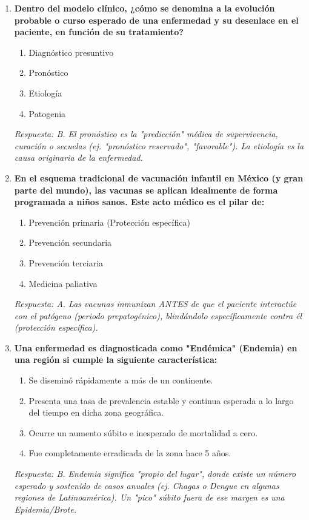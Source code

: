 \documentclass[spanish,letterpaper,oneside]{article}
\begin{document}
\begin{enumerate}[label=\textbf{\arabic*.}]
    \item \textbf{Dentro del modelo clínico, ¿cómo se denomina a la evolución probable o curso esperado de una enfermedad y su desenlace en el paciente, en función de su tratamiento?}
    \begin{enumerate}
        \item[A)] Diagnóstico presuntivo
        \item[B)] Pronóstico
        \item[C)] Etiología
        \item[D)] Patogenia
    \end{enumerate}
    \textit{Respuesta: B. El pronóstico es la "predicción" médica de supervivencia, curación o secuelas (ej. "pronóstico reservado", "favorable"). La etiología es la causa originaria de la enfermedad.}

    \item \textbf{En el esquema tradicional de vacunación infantil en México (y gran parte del mundo), las vacunas se aplican idealmente de forma programada a niños sanos. Este acto médico es el pilar de:}
    \begin{enumerate}
        \item[A)] Prevención primaria (Protección específica)
        \item[B)] Prevención secundaria
        \item[C)] Prevención terciaria
        \item[D)] Medicina paliativa
    \end{enumerate}
    \textit{Respuesta: A. Las vacunas inmunizan ANTES de que el paciente interactúe con el patógeno (periodo prepatogénico), blindándolo específicamente contra él (protección específica).}

    \item \textbf{Una enfermedad es diagnosticada como "Endémica" (Endemia) en una región si cumple la siguiente característica:}
    \begin{enumerate}
        \item[A)] Se diseminó rápidamente a más de un continente.
        \item[B)] Presenta una tasa de prevalencia estable y continua esperada a lo largo del tiempo en dicha zona geográfica.
        \item[C)] Ocurre un aumento súbito e inesperado de mortalidad a cero.
        \item[D)] Fue completamente erradicada de la zona hace 5 años.
    \end{enumerate}
    \textit{Respuesta: B. Endemia significa "propio del lugar", donde existe un número esperado y sostenido de casos anuales (ej. Chagas o Dengue en algunas regiones de Latinoamérica). Un "pico" súbito fuera de ese margen es una Epidemia/Brote.}


\end{enumerate}
\end{document}
